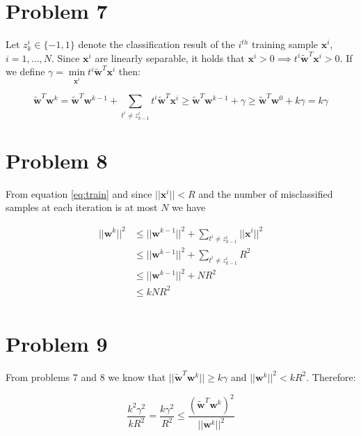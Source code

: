 \documentclass[12pt]{article}
\begin{document}
\section*{Problem 7}

Let $z_k^i \in \{-1, 1\}$ denote the classification result of the $i^{th}$ training sample $\mathbf{x}^i$, $i = 1, \ldots, N$. Since $\mathbf{x}^i$ are linearly separable, it holds that $ \mathbf{x}^i > 0 \implies t^i \widetilde{\mathbf{w}}^T \mathbf{x}^i > 0$. If we define $\gamma = \min\limits_{\mathbf{x}^i} t^i \widetilde{\mathbf{w}}^T \mathbf{x}^i$ then:

\begin{equation}
 \widetilde{\mathbf{w}}^T \mathbf{w}^k = \widetilde{\mathbf{w}}^T \mathbf{w}^{k-1} + \sum_{t^i \neq z_{k-1}^i} t^i \widetilde{\mathbf{w}}^T \mathbf{x}^i \geq \widetilde{\mathbf{w}}^T \mathbf{w}^{k-1} + \gamma \geq \widetilde{\mathbf{w}}^T \mathbf{w}^{0} + k \gamma = k \gamma
\end{equation}


\section*{Problem 8}

From equation \ref{eq:train} and since $||\mathbf{x}^i|| < R$ and the number of misclassified samples at each iteration is at most $N$ we have

\begin{equation}
 \begin{align}
  ||\mathbf{w}^k||^2 &\leq ||\mathbf{w}^{k-1}||^2 + \sum_{t^i \neq z_{k-1}^i} ||\mathbf{x}^i||^2 \\
		     &\leq ||\mathbf{w}^{k-1}||^2 + \sum_{t^i \neq z_{k-1}^i} R^2 \\
		     &\leq ||\mathbf{w}^{k-1}||^2 + N R^2 \\
		     &\leq k N R^2 \\
 \end{align}
\end{equation}

\section*{Problem 9}
  From problems 7 and 8 we know that $||\widetilde{\mathbf{w}}^T \mathbf{w}^k|| \geq k \gamma$ and $||\mathbf{w}^k||^2 < k R^2$. Therefore:

\begin{equation}
 \frac{k^2 \gamma^2}{k R^2} = \frac{k \gamma^2}{R^2} \leq \frac{\left( \widetilde{\mathbf{w}}^T \mathbf{w}^k \right)^2}{||\mathbf{w}^k||^2}
\end{equation}
\end{document}
